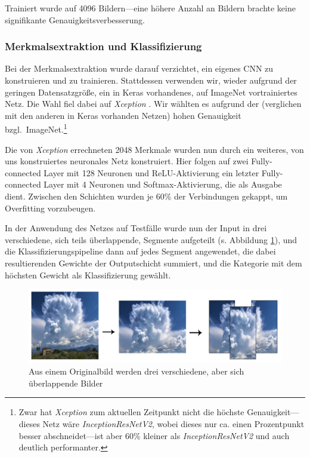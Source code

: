 \documentclass[a4,german]{article}
\begin{document}
Trainiert wurde auf 4096 Bildern---eine höhere Anzahl an Bildern brachte keine signifikante Genauigkeitsverbesserung.


\subsubsection{Merkmalsextraktion und Klassifizierung}
\label{sec:neural}

Bei der Merkmalsextraktion wurde darauf verzichtet, ein eigenes CNN zu konstruieren und zu trainieren.
Stattdessen verwenden wir, wieder aufgrund der geringen Datensatzgröße, ein in Keras vorhandenes, auf ImageNet vortrainiertes Netz.
Die Wahl fiel dabei auf \emph{Xception} \cite{xception}.
Wir wählten es aufgrund der (verglichen mit den anderen in Keras vorhanden Netzen) hohen Genauigkeit bzgl.\ ImageNet.\footnote{Zwar hat \emph{Xception} zum aktuellen Zeitpunkt nicht die höchste Genauigkeit---dieses Netz wäre \emph{InceptionResNetV2}, wobei dieses nur ca. einen Prozentpunkt besser abschneidet---ist aber 60\% kleiner als \emph{InceptionResNetV2} und auch deutlich performanter.}

Die von \emph{Xception} errechneten 2048 Merkmale wurden nun durch ein weiteres, von uns konstruiertes neuronales Netz konstruiert.
Hier folgen auf zwei Fully-connected Layer mit 128 Neuronen und ReLU-Aktivierung ein letzter Fully-connected Layer mit 4 Neuronen und Softmax-Aktivierung, die als Ausgabe dient.
Zwischen den Schichten wurden je 60\% der Verbindungen gekappt, um Overfitting vorzubeugen.


In der Anwendung des Netzes auf Testfälle wurde nun der Input in drei verschiedene, sich teils überlappende, Segmente aufgeteilt (s. Abbildung \ref{fig:augmentation}), und die Klassifizierungspipeline dann auf jedes Segment angewendet, die dabei resultierenden Gewichte der Outputschicht summiert, und die Kategorie mit dem höchsten Gewicht als Klassifizierung gewählt.

\begin{figure}[h!]
\centering
\includegraphics[width=\textwidth]{Augmentation}
\caption{Aus einem Originalbild werden drei verschiedene, aber sich überlappende Bilder}
    \label{fig:augmentation}
\end{figure}
\end{document}

